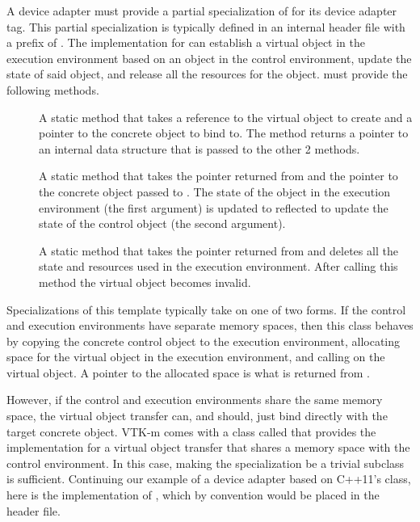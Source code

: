 A device adapter must provide a partial specialization of  for its device adapter tag.
This partial specialization is typically defined in an internal header file with a prefix of .
The implementation for  can establish a virtual object in the execution environment based on an object in the control environment, update the state of said object, and release all the resources for the object.
 must provide the following methods.

\begin{description}
\item[]
  A static method that takes a reference to the virtual object to create and a pointer to the concrete object to bind to.
  The method returns a  pointer to an internal data structure that is passed to the other 2 methods.
\item[]
  A static method that takes the  pointer returned from  and the pointer to the concrete object passed to .
  The state of the object in the execution environment (the first argument) is updated to reflected to update the state of the control object (the second argument).
\item[]
  A static method that takes the  pointer returned from  and deletes all the state and resources used in the execution environment.
  After calling this method the virtual object becomes invalid.
\end{description}

Specializations of this template typically take on one of two forms.
If the control and execution environments have separate memory spaces, then this class behaves by copying the concrete control object to the execution environment, allocating space for the virtual object in the execution environment, and calling  on the virtual object.
A pointer to the allocated space is what is returned from .

However, if the control and execution environments share the same memory space, the virtual object transfer can, and should, just bind directly with the target concrete object.
VTK-m comes with a class called  that provides the implementation for a virtual object transfer that shares a memory space with the control environment.
In this case, making the  specialization be a trivial subclass is sufficient.
Continuing our example of a device adapter based on C++11's  class, here is the implementation of , which by convention would be placed in the  header file.

